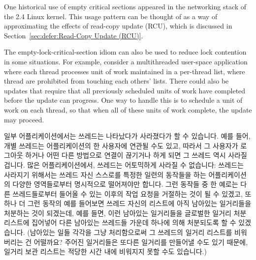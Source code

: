 {	One historical use of empty critical sections appeared in the
	networking stack of the 2.4 Linux kernel.
	This usage pattern can be thought of as a way of approximating
	the effects of read-copy update (RCU), which is discussed in
	Section~\ref{sec:defer:Read-Copy Update (RCU)}.

	The empty-lock-critical-section idiom can also be used to
	reduce lock contention in some situations.
	For example, consider a multithreaded user-space application where
	each thread processes unit of work maintained in a per-thread
	list, where thread are prohibited from touching each others'
	lists.
	There could also be updates that require that all previously
	scheduled units of work have completed before the update can
	progress.
	One way to handle this is to schedule a unit of work on each
	thread, so that when all of these units of work complete, the
	update may proceed.
	\fi

	일부 어플리케이션에서는 쓰레드는 나타났다가 사라졌다가 할 수 있습니다.
	예를 들어, 개별 쓰레드는 어플리케이션의 한 사용자에 연관될 수도 있고,
	따라서 그 사용자가 로그아웃 하거나 어떤 다른 방법으로 연결이 끊기거나
	하게 되면 그 쓰레드 역시 사라질 겁니다.
	많은 어플리케이션에서, 쓰레드는 어토믹하게 사라질 수 없습니다: 쓰레드는
	사라지기 위해서는 쓰레드 자신 스스로를 특정한 일련의 동작들을 하는
	어플리케이션의 다양한 영역들로부터 명시적으로 떨어져야만 합니다.
	그런 동작들 중 한 예로는 다른 쓰레드들로부터 들어올 수 있는 이후의 작업
	요청을 거절하는 것이 될 수 있겠고, 또하나 더 그런 동작의 예를 들어보면
	쓰레드 자신의 리스트에 아직 남아있는 일거리들을 처분하는 것이 되겠는데,
	예를 들면, 이런 남아있는 일거리들을 글로벌한 일거리 처분 리스트에
	집어넣어 다른 남아있는 쓰레드들 가운데 하나에 의해 처분되도록 할 수
	있겠습니다.
	(남아있는 일들 각각을 그냥 처리함으로써 그 쓰레드의 일거리 리스트를
	비워버리는 건 어떨까요?
	주어진 일거리들은 또다른 일거리를 만들어낼 수도 있기 때문에, 일거리
	보관 리스트는 적당한 시간 내에 비워지지 못할 수도 있습니다.)

}
